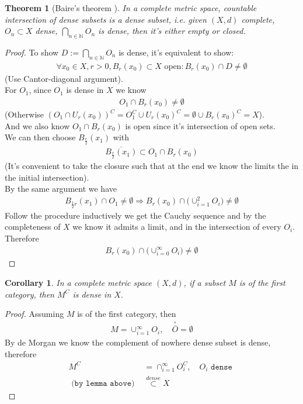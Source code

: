 \documentclass[a4paper,11pt,fleqn]{book}
\newtheorem{theorem}{Theorem}[section]
\newtheorem{corollary}{Corollary}[theorem]
\theoremstyle{definition}
\theoremstyle{remark}
\begin{document}
\begin{theorem}[Baire's theorem ]
	In a complete metric space, countable intersection of dense subsets is a dense subset, i.e. given $(X, d)$ complete, $O_n \subset X$ dense, $\bigcap_{n \in \mathbb{N}} O_n$ is dense, then it's either empty or closed. 
\end{theorem}
\begin{proof}
	To show $D:= \bigcap_{n \in \mathbb{N}} O_n$ is dense, it's equivalent to show:
	\begin{align*}
		\forall x_0 \in X, r > 0, B_r(x_0) \subset X \text{ open}: B_r(x_0) \cap D \neq \emptyset 
	\end{align*}
	(Use Cantor-diagonal argument).\\
	For $O_1$, since $O_1$ is dense in $X$ we know 
	\begin{align*}
		O_1 \cap B_r(x_0) \neq \emptyset
	\end{align*}
	(Otherwise $(O_1 \cap U_r(x_0))^C = O_1^C \cup U_r(x_0)^C = \emptyset \cup B_r(x_0)^C = X$).\\
	And we also know $O_1 \cap B_r(x_0)$ is open since it's intersection of open sets.\\
	We can then choose $B_{\frac{r}{2}}(x_1)$ with
	\begin{align*}
		\overline{B_{\frac{r}{2}}(x_1)} \subset O_1 \cap B_r(x_0)
	\end{align*}
	(It's convenient to take the closure such that at the end we know the limits the in the initial intersection).\\
	By the same argument we have
	\begin{align*}
		B_{\frac{1}{2} r}(x_1) \cap O_1 \neq \emptyset \Rightarrow B_r(x_0) \cap \bigg( \cup_{i= 1}^2 O_i \bigg) \neq \emptyset
	\end{align*}
	Follow the procedure inductively we get the Cauchy sequence and by the completeness of $X$ we know it admits a limit, and in the intersection of every $O_i$. Therefore
	\begin{align*}
		B_r(x_0) \cap \bigg( \cup_{i = 0}^\infty O_i \bigg) \neq \emptyset
	\end{align*}
\end{proof}

\begin{corollary}
	In a complete metric space $(X, d)$, if a subset $M$ is of the first category, then $M^C$ is dense in $X$.
\end{corollary}
\begin{proof}
	Assuming $M$ is of the first category, then 
	\begin{align*}
		M = \cup_{i = 1}^\infty O_i, \quad \overset{\circ}{\overline{O}} = \emptyset
	\end{align*}
	By de Morgan we know the complement of nowhere dense subset is dense, therefore
	\begin{align*}
		M^C &= \cap_{ i= 1}^\infty O_i^C, \quad O_i \texttt{ dense }\\
		\texttt{ (by lemma above) } 
		& \overset{dense}{\subset} X 
	\end{align*}
\end{proof}
\end{document}
